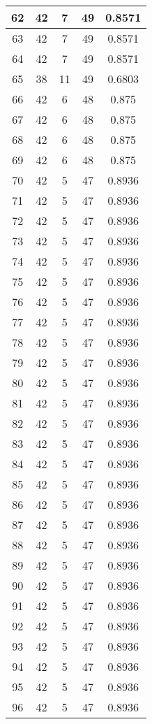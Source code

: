\documentclass[letterpaper, 12pt]{article}
\begin{document}
\begin{longtable}{|c|c|c|c|c|}
\hline
62 & 42 & 7 & 49 & 0.8571 \\
\hline
63 & 42 & 7 & 49 & 0.8571 \\
\hline
64 & 42 & 7 & 49 & 0.8571 \\
\hline
65 & 38 & 11 & 49 & 0.6803 \\
\hline
66 & 42 & 6 & 48 & 0.875 \\
\hline
67 & 42 & 6 & 48 & 0.875 \\
\hline
68 & 42 & 6 & 48 & 0.875 \\
\hline
69 & 42 & 6 & 48 & 0.875 \\
\hline
70 & 42 & 5 & 47 & 0.8936 \\
\hline
71 & 42 & 5 & 47 & 0.8936 \\
\hline
72 & 42 & 5 & 47 & 0.8936 \\
\hline
73 & 42 & 5 & 47 & 0.8936 \\
\hline
74 & 42 & 5 & 47 & 0.8936 \\
\hline
75 & 42 & 5 & 47 & 0.8936 \\
\hline
76 & 42 & 5 & 47 & 0.8936 \\
\hline
77 & 42 & 5 & 47 & 0.8936 \\
\hline
78 & 42 & 5 & 47 & 0.8936 \\
\hline
79 & 42 & 5 & 47 & 0.8936 \\
\hline
80 & 42 & 5 & 47 & 0.8936 \\
\hline
81 & 42 & 5 & 47 & 0.8936 \\
\hline
82 & 42 & 5 & 47 & 0.8936 \\
\hline
83 & 42 & 5 & 47 & 0.8936 \\
\hline
84 & 42 & 5 & 47 & 0.8936 \\
\hline
85 & 42 & 5 & 47 & 0.8936 \\
\hline
86 & 42 & 5 & 47 & 0.8936 \\
\hline
87 & 42 & 5 & 47 & 0.8936 \\
\hline
88 & 42 & 5 & 47 & 0.8936 \\
\hline
89 & 42 & 5 & 47 & 0.8936 \\
\hline
90 & 42 & 5 & 47 & 0.8936 \\
\hline
91 & 42 & 5 & 47 & 0.8936 \\
\hline
92 & 42 & 5 & 47 & 0.8936 \\
\hline
93 & 42 & 5 & 47 & 0.8936 \\
\hline
94 & 42 & 5 & 47 & 0.8936 \\
\hline
95 & 42 & 5 & 47 & 0.8936 \\
\hline
96 & 42 & 5 & 47 & 0.8936 \\

\end{longtable}
\end{document}
